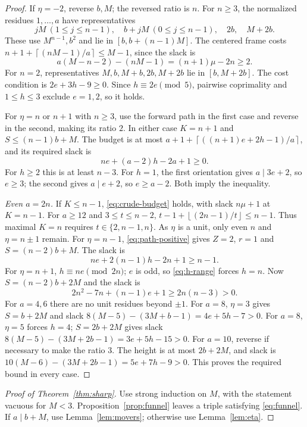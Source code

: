 \documentclass[11pt,a4paper,reqno]{amsart}
\theoremstyle{definition}
\theoremstyle{remark}
\newcommand{\ceil}[1]{\left\lceil #1\right\rceil}
\newcommand{\floor}[1]{\left\lfloor #1\right\rfloor}
\begin{document}
\begin{proof}
If $\eta=-2$, reverse $b,M$; the reversed ratio is $n$.
For $n\ge3$, the normalized residues $1,\ldots,a$ have representatives
\[
 jM\ (1\le j\le n-1),\quad b+jM\ (0\le j\le n-1),\quad 2b,\quad M+2b.
\]
These use $M^{n-1},b^2$ and lie in $[b,b+(n-1)M]$.
The centered frame costs $n+1+\ceil{(nM-1)/a}\le M-1$, since the slack is
\[
 a(M-n-2)-(nM-1)=(n+1)\mu-2n\ge2.
\]
For $n=2$, representatives $M,b,M+b,2b,M+2b$ lie in $[b,M+2b]$.
The cost condition is $2e+3h-9\ge0$. Since $h\equiv2e\pmod5$,
pairwise coprimality and $1\le h\le3$ exclude $e=1,2$, so it holds.

For $\eta=n$ or $n+1$ with $n\ge3$, use the forward path in the first
case and reverse in the second, making its ratio $2$. In either case
$K=n+1$ and $S\le(n-1)b+M$. The budget is at most
$a+1+\ceil{((n+1)e+2h-1)/a}$, and its required slack is
\begin{equation}\label{eq:eta-n}
 ne+(a-2)h-2a+1\ge0.
\end{equation}
For $h\ge2$ this is at least $n-3$. For $h=1$, the first orientation gives
$a\mid3e+2$, so $e\ge3$; the second gives $a\mid e+2$, so $e\ge a-2$.
Both imply the inequality.

\smallskip\noindent\emph{Even $a=2n$.}
If $K\le n-1$, \eqref{eq:crude-budget} holds, with slack $n\mu+1$ at
$K=n-1$. For $a\ge12$ and $3\le t\le n-2$,
$t-1+\floor{(2n-1)/t}\le n-1$. Thus maximal $K=n$ requires
$t\in\{2,n-1,n\}$. As $\eta$ is a unit, only even $n$ and
$\eta=n\pm1$ remain.
For $\eta=n-1$, \eqref{eq:path-positive} gives $Z=2$, $r=1$ and
$S=(n-2)b+M$. The slack is
\begin{equation}\label{eq:eta-even-minus}
 ne+2(n-1)h-2n+1\ge n-1.
\end{equation}
For $\eta=n+1$, $h\equiv ne\pmod{2n}$; $e$ is odd, so
\eqref{eq:h-range} forces $h=n$. Now $S=(n-2)b+2M$ and the slack is
\begin{equation}\label{eq:eta-even-plus}
 2n^2-7n+(n-1)e+1\ge2n(n-3)>0.
\end{equation}
For $a=4,6$ there are no unit residues beyond $\pm1$.
For $a=8$, $\eta=3$ gives $S=b+2M$ and slack
$8(M-5)-(3M+b-1)=4e+5h-7>0$.
For $a=8$, $\eta=5$ forces $h=4$; $S=2b+2M$ gives slack
$8(M-5)-(3M+2b-1)=3e+5h-15>0$.
For $a=10$, reverse if necessary to make the ratio $3$.
The height is at most $2b+2M$, and slack is
$10(M-6)-(3M+2b-1)=5e+7h-9>0$.
This proves the required bound in every case.
\end{proof}
\begin{proof}[Proof of Theorem~\ref{thm:sharp}]
Use strong induction on $M$, with the statement vacuous for $M<3$.
Proposition~\ref{prop:funnel} leaves a triple satisfying \eqref{eq:funnel}.
If $a\mid b+M$, use Lemma~\ref{lem:movers}; otherwise use Lemma~\ref{lem:eta}.
\end{proof}
\end{document}
